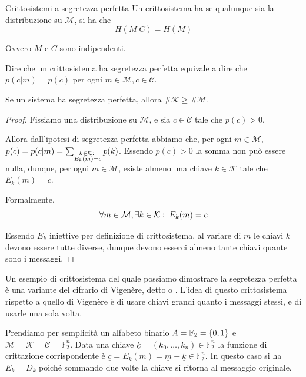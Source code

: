 \begin{definition}{Crittosistemi a segretezza perfetta}
  Un crittosistema ha  se qualunque sia la distribuzione su \(\mathcal{M}\), si ha che
  \[H(M|C) = H(M)\]

  Ovvero \(M\) e \(C\) sono indipendenti.
\end{definition}

\begin{observation}{}
  Dire che un crittosistema ha segretezza perfetta equivale a dire che \(p(c|m) = p(c)\) per ogni \(m\in\mathcal{M}, c\in\mathcal{C}\).
\end{observation}

\begin{proposition}{}
  Se un sistema ha segretezza perfetta, allora \(\# \mathcal{K} \geq \# \mathcal{M}\).
\end{proposition}

\begin{proof}{}
  Fissiamo una distribuzione su \(\mathcal{M}\), e sia \(c \in \mathcal{C}\) tale che \(p(c) > 0\).

  Allora dall'ipotesi di segretezza perfetta abbiamo che, per ogni \(m\in\mathcal{M}\), \(p(c) = p(c|m) = \sum_{\substack{k \in \mathcal{K} :\;\\ E_k(m)=c}} p(k)\).
  Essendo \(p(c) > 0\) la somma non può essere nulla, dunque, per ogni \(m\in\mathcal{M}\), esiste almeno una chiave \(k \in \mathcal{K}\) tale che \(E_k(m) = c\).

  Formalmente,
  \[\forall m \in \mathcal{M}, \exists k \in \mathcal{K} :\; E_k(m) = c\]

  Essendo \(E_k\) iniettive per definizione di crittosistema, al variare di \(m\) le chiavi \(k\) devono essere tutte diverse, dunque devono esserci almeno tante chiavi quante sono i messaggi.
\end{proof}

Un esempio di crittosistema del quale possiamo dimostrare la segretezza perfetta è una variante del cifrario di Vigenère, detto  o .
L'idea di questo crittosistema rispetto a quello di Vigenère è di usare chiavi grandi quanto i messaggi stessi, e di usarle una sola volta.

Prendiamo per semplicità un alfabeto binario \(A = \mathbb{F}_2 = \set{0,1}\) e \(\mathcal{M}=\mathcal{K}=\mathcal{C} = \mathbb{F}_2^n\).
Data una chiave \(\underline{k} = (k_0, \ldots, k_n) \in \mathbb{F}_2^n\) la funzione di crittazione corrispondente è \(\underline{c} = E_k(m) = \underline{m} + \underline{k} \in \mathbb{F}_2^n\).
In questo caso si ha \(E_k = D_k\) poiché sommando due volte la chiave si ritorna al messaggio originale.

